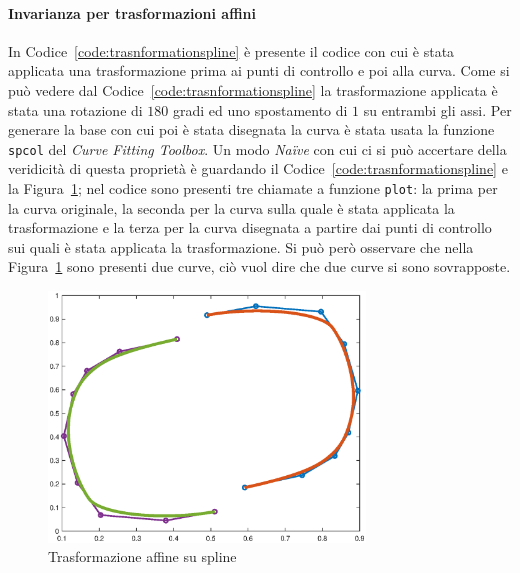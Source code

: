 \documentclass[a4paper, 10pt]{article}
\begin{document}
\paragraph{Invarianza per trasformazioni affini} In Codice~\ref{code:trasnformationspline} è 
presente il codice con cui è stata applicata una trasformazione
prima ai punti di controllo e poi alla curva. Come si può vedere dal 
Codice~\ref{code:trasnformationspline} la 
trasformazione applicata è stata una rotazione di $180$ gradi
ed uno spostamento di $1$ su entrambi gli assi. Per generare la base con cui poi è 
stata disegnata la curva è stata usata la funzione \texttt{spcol} del \textit{Curve Fitting Toolbox}.
Un modo \textit{Naïve} con cui ci si può accertare della veridicità di questa proprietà è 
guardando il Codice~\ref{code:trasnformationspline} e la Figura~\ref{fig:trasformationspline}; nel codice sono presenti 
tre chiamate a funzione \texttt{plot}: la prima per la curva originale, la seconda per la curva sulla quale è
stata applicata la trasformazione e la terza per la curva disegnata a partire dai punti di controllo
sui quali è stata applicata la trasformazione. Si può però osservare che nella Figura~\ref{fig:trasformationspline} sono presenti due curve, 
ciò vuol dire che
due curve si sono sovrapposte.
\begin{figure}[h]
  \centering
  \includegraphics[width=0.75\textwidth]{figure/transformation_spline.eps}
  \caption{Trasformazione affine su spline}
  \label{fig:trasformationspline}
\end{figure} 

\end{document}
